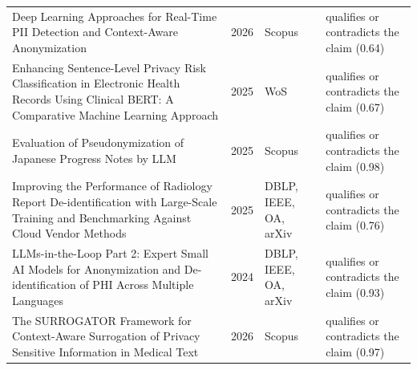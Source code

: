 \begin{longtable}{@{}%
  >{\raggedright\arraybackslash}p{}c%
  >{\raggedright\arraybackslash}p{}%
  >{\raggedright\arraybackslash}p{}@{}}
Deep Learning Approaches for Real-Time PII Detection and Context-Aware Anonymization & 2026 & Scopus & qualifies or contradicts the claim (0.64) \\
Enhancing Sentence-Level Privacy Risk Classification in Electronic Health Records Using Clinical BERT: A Comparative Machine Learning Approach & 2025 & WoS & qualifies or contradicts the claim (0.67) \\
Evaluation of Pseudonymization of Japanese Progress Notes by LLM & 2025 & Scopus & qualifies or contradicts the claim (0.98) \\
Improving the Performance of Radiology Report De-identification with Large-Scale Training and Benchmarking Against Cloud Vendor Methods & 2025 & DBLP, IEEE, OA, arXiv & qualifies or contradicts the claim (0.76) \\
LLMs-in-the-Loop Part 2: Expert Small AI Models for Anonymization and De-identification of PHI Across Multiple Languages & 2024 & DBLP, IEEE, OA, arXiv & qualifies or contradicts the claim (0.93) \\
The SURROGATOR Framework for Context-Aware Surrogation of Privacy Sensitive Information in Medical Text & 2026 & Scopus & qualifies or contradicts the claim (0.97) \\
\end{longtable}
\endgroup
